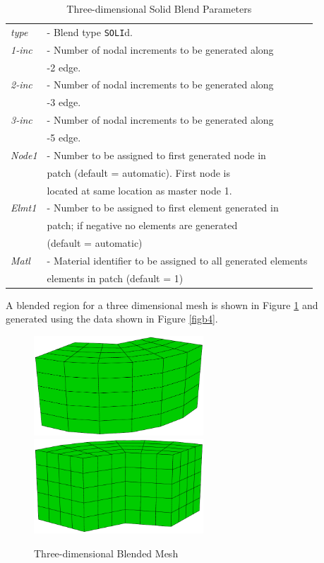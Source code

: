 \begin{table}[ht!]
\begin{center}
\begin{tabular}{l l}
\it type  &- Blend type {\tt SOLI}d. \\
\it 1-inc &- Number of nodal increments to be generated along \\
          &\quad 1-2 edge. \\
\it 2-inc & - Number of nodal increments to be generated along \\
          &\quad 2-3 edge. \\
\it 3-inc &- Number of nodal increments to be generated along \\
          &\quad 1-5 edge. \\
\it Node1 &- Number to be assigned to first generated node in \\
          &\quad patch (default = automatic).  First node is \\
          &\quad located at same location as master node 1. \\
\it Elmt1 &- Number to be assigned to first element generated in \\
          &\quad patch; if negative no elements are generated \\
          &\quad (default = automatic) \\
\it Matl  &- Material identifier to be assigned to all generated elements \\
          &\quad elements in patch (default = 1) \\
\end{tabular}
\end{center}
\caption{Three-dimensional Solid Blend Parameters}
\label{tabb2}
\end{table}

A blended region for a three dimensional mesh is shown in Figure \ref{figb3}
and generated using the data shown in Figure \ref{figb4}.

\begin{figure}[ht!]
\centerline {\hfil \includegraphics[width=2.5in]{figs/figb3a} \hspace{0.5in}
\includegraphics[width=2.5in]{figs/figb3b} \hfil}
\caption{Three-dimensional Blended Mesh}
\label{figb3}
\end{figure}

